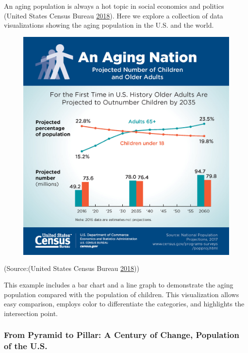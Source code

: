 \documentclass[]{book}
\begin{document}
An aging population is always a hot topic in social economics and
politics (United States Census Bureau
\protect\hyperlink{ref-aging_nation}{2018}). Here we explore a
collection of data visualizations showing the aging population in the
U.S. and the world.

\begin{figure}
\centering
\includegraphics{images/aging_nation.jpg}
\caption{}
\end{figure}

(Source:(United States Census Bureau
\protect\hyperlink{ref-aging_nation}{2018}))

This example includes a bar chart and a line graph to demonstrate the
aging population compared with the population of children. This
visualization allows easy comparison, employs color to differentiate the
categories, and highlights the intersection point.

\subsubsection{From Pyramid to Pillar: A Century of Change, Population
of the
U.S.}\label{from-pyramid-to-pillar-a-century-of-change-population-of-the-u.s.}
\end{document}
